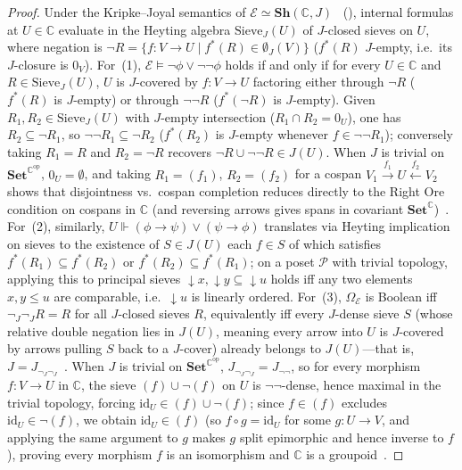 \begin{proof}
Under the Kripke--Joyal semantics of $\mathcal{E} \simeq \mathbf{Sh}(\mathbb{C}, J)$~\cite[\S D4.6]{Johnstone02} (\cite[Ch.~III, Ch.~VI]{MacLaneMoerdijk92}), internal formulas at $U \in \mathbb{C}$ evaluate in the Heyting algebra $\mathrm{Sieve}_J(U)$ of $J$-closed sieves on $U$, where negation is $\neg R = \{f : V \to U \mid f^*(R) \in \emptyset_J(V)\}$ ($f^*(R)$ $J$-empty, i.e.\ its $J$-closure is $0_V$).
For~(1), $\mathcal{E} \models \neg\phi \lor \neg\neg\phi$ holds if and only if for every $U \in \mathbb{C}$ and $R \in \mathrm{Sieve}_J(U)$, $U$ is $J$-covered by $f : V \to U$ factoring either through $\neg R$ ($f^*(R)$ is $J$-empty) or through $\neg\neg R$ ($f^*(\neg R)$ is $J$-empty). Given $R_1, R_2 \in \mathrm{Sieve}_J(U)$ with $J$-empty intersection ($R_1 \cap R_2 = 0_U$), one has $R_2 \subseteq \neg R_1$, so $\neg\neg R_1 \subseteq \neg R_2$ ($f^*(R_2)$ is $J$-empty whenever $f \in \neg\neg R_1$); conversely taking $R_1 = R$ and $R_2 = \neg R$ recovers $\neg R \cup \neg\neg R \in J(U)$. When $J$ is trivial on $\mathbf{Set}^{\mathbb{C}^{\mathrm{op}}}$, $0_U = \emptyset$, and taking $R_1 = (f_1)$, $R_2 = (f_2)$ for a cospan $V_1 \xrightarrow{f_1} U \xleftarrow{f_2} V_2$ shows that disjointness vs.\ cospan completion reduces directly to the Right Ore condition on cospans in $\mathbb{C}$ (and reversing arrows gives spans in covariant $\mathbf{Set}^{\mathbb{C}}$)~\cite[\S D4.6, Lemma~D4.6.3]{Johnstone02}.
For~(2), similarly, $U \Vdash (\phi \to \psi) \lor (\psi \to \phi)$ translates via Heyting implication on sieves to the existence of $S \in J(U)$ each $f \in S$ of which satisfies $f^*(R_1) \subseteq f^*(R_2)$ or $f^*(R_2) \subseteq f^*(R_1)$; on a poset $\mathcal{P}$ with trivial topology, applying this to principal sieves $\downarrow x, \downarrow y \subseteq \downarrow u$ holds iff any two elements $x, y \le u$ are comparable, i.e.\ $\downarrow u$ is linearly ordered.
For~(3), $\Omega_{\mathcal{E}}$ is Boolean iff $\neg_J\neg_J R = R$ for all $J$-closed sieves $R$, equivalently iff every $J$-dense sieve $S$ (whose relative double negation lies in $J(U)$, meaning every arrow into $U$ is $J$-covered by arrows pulling $S$ back to a $J$-cover) already belongs to $J(U)$---that is, $J = J_{\neg_J \neg_J}$~\cite[\S A4.5]{Johnstone02}. When $J$ is trivial on $\mathbf{Set}^{\mathbb{C}^{\mathrm{op}}}$, $J_{\neg_J \neg_J} = J_{\neg\neg}$, so for every morphism $f : V \to U$ in $\mathbb{C}$, the sieve $(f) \cup \neg(f)$ on $U$ is $\neg\neg$-dense, hence maximal in the trivial topology, forcing $\mathrm{id}_U \in (f) \cup \neg(f)$; since $f \in (f)$ excludes $\mathrm{id}_U \in \neg(f)$, we obtain $\mathrm{id}_U \in (f)$ (so $f \circ g = \mathrm{id}_U$ for some $g : U \to V$, and applying the same argument to $g$ makes $g$ split epimorphic and hence inverse to $f$), proving every morphism $f$ is an isomorphism and $\mathbb{C}$ is a groupoid~\cite[\S A4.5]{Johnstone02}.

\end{proof}
